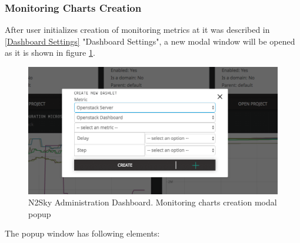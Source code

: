 \subsubsection{Monitoring Charts Creation}\label{Monitoring charts creation}

After user initializes creation of monitoring metrics at it was described in \autoref{Dashboard Settings} "Dashboard Settings", a new modal window will be opened as it is shown in figure \ref{fig:create_monitoring}.

\begin{figure}[H]
\begin{center}
  \includegraphics[width=\linewidth]{components/4/pics/create_monitoring.png}
  \caption{N2Sky Administration Dashboard. Monitoring charts creation modal popup}
  \label{fig:create_monitoring}
\end{center}
\end{figure}

The popup window has following elements:

